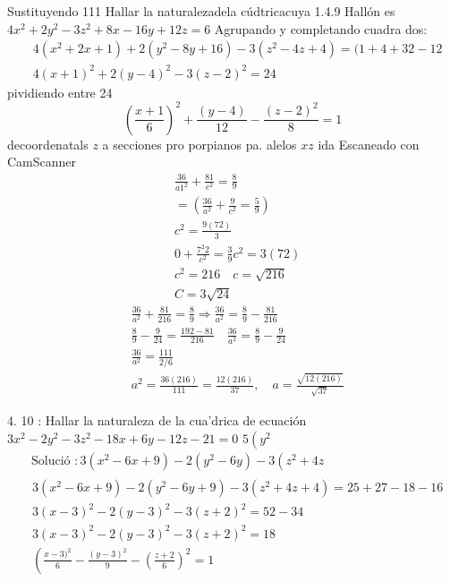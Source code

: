 Sustituyendo
111 Hallar la naturalezadela cúdtricacuya
1.4.9 Hallón es $4 x^2+2 y^2-3 z^2+8 x-16 y+12 z=6$
Agrupando y completando cuadra dos:
$$
\begin{aligned}
	& 4\left(x^2+2 x+1\right)+2\left(y^2-8 y+16\right)-3\left(z^2-4 z+4\right)=(1+4+32-12 \\
	& 4(x+1)^2+2(y-4)^2-3(z-2)^2=24
\end{aligned}
$$
pividiendo entre 24
$$
\left(\frac{x+1}{6}\right)^2+\frac{(y-4)}{12}-\frac{(z-2)^2}{8}=1
$$
decoordenatals $z$ a secciones pro
porpianos pa. alelos $x z$ ida
Escaneado con CamScanner
$$
\begin{aligned}
	& \frac{36}{a 1^2}+\frac{81}{c^2}=\frac{8}{9} \\
	& =\left(\frac{36}{a^2}+\frac{9}{c^2}=\frac{5}{9}\right) \\
	& c^2=\frac{9(72)}{3} \\
	& 0+\frac{7^2 2}{c^2}=\frac{3}{9} c^2=3(72) \\
	& c^2=216 \quad c=\sqrt{216} \\
	& C=3 \sqrt{24}
\end{aligned}
$$
$$
\begin{aligned}
	& \frac{36}{a^2}+\frac{81}{216}=\frac{8}{9} \Rightarrow \frac{36}{a^2}=\frac{8}{9}-\frac{81}{216} \\
	& \frac{8}{9}-\frac{9}{24}=\frac{192-81}{216} \quad \frac{36}{a^2}=\frac{8}{9}-\frac{9}{24} \\
	& \frac{36}{a^2}=\frac{111}{2 / 6} \\
	& a^2=\frac{36(216)}{111}=\frac{12(216)}{37}, \quad a=\frac{\sqrt{12(216)}}{\sqrt{37}}
\end{aligned}
$$




4. 10 : Hallar la naturaleza de la cua'drica de ecuación
$3 x^2-2 y^2-3 z^2-18 x+6 y-12 z-21=0$
$5\left(y^2\right.$
$$
\begin{aligned}
	& \text { Solució }: 3\left(x^2-6 x+9\right)-2\left(y^2-6 y\right)-3\left(z^2+4 z\right. \\
	& \begin{array}{l}
		3\left(x^2-6 x+9\right)-2\left(y^2-6 y+9\right)-3\left(z^2+4 z+4\right)=25+27-18-16 \\
		3(x-3)^2-2(y-3)^2-3(z+2)^2=52-34 \\
		3(x-3)^2-2(y-3)^2-3(z+2)^2=18 \\
		\left(\frac{x-3)^2}{6}-\frac{(y-3)^2}{9}-\left(\frac{z+2}{6}\right)^2=1\right.
	\end{array}
\end{aligned}
$$

